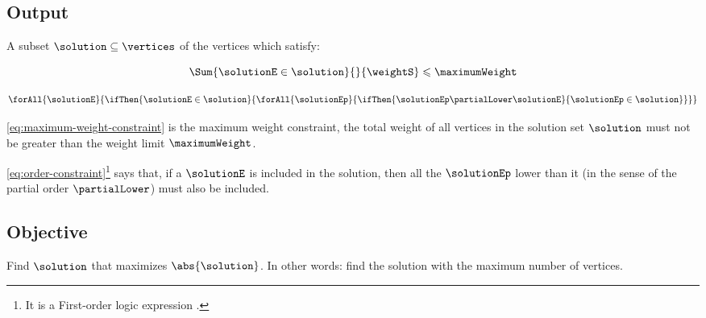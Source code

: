 \subsection{Output}

A subset $\solution \subseteq \vertices$ of the vertices which satisfy:

\begin{equation}
    \label{eq:maximum-weight-constraint}
    \Sum
        {\solutionE \in \solution}
        {}
        {\weightS}
    \leqslant
    \maximumWeight
\end{equation}

\begin{equation}
    \label{eq:order-constraint}
    \forAll
        {\solutionE}
        {\ifThen
            {\solutionE \in \solution}
            {\forAll
                {\solutionEp}
                {\ifThen
                    {\solutionEp \partialLower \solutionE}
                    {\solutionEp \in \solution}
                }
            }
        }
\end{equation}

\eqref{eq:maximum-weight-constraint} is the maximum weight constraint, the total weight of all vertices in the solution set $\solution$ must not be greater than the weight limit $\maximumWeight$.

\eqref{eq:order-constraint}\footnote{It is a First-order logic expression \cite{bib:logic}.} says that, if a $\solutionE$ is included in the solution, then all the $\solutionEp$ lower than it (in the sense of the partial order $\partialLower$) must also be included.

\subsection{Objective}

Find $\solution$ that maximizes $\abs{\solution}$. In other words: find the solution with the maximum number of vertices.
